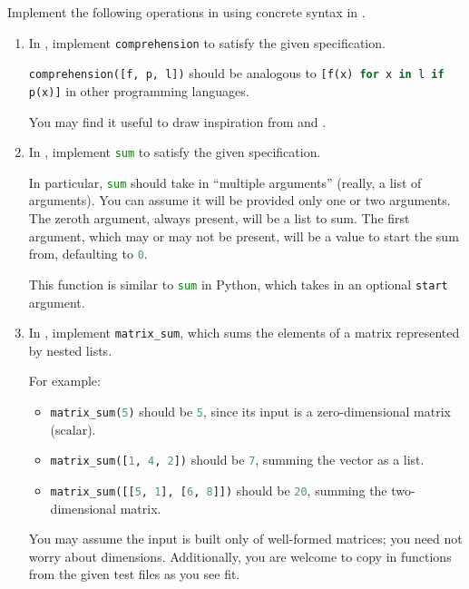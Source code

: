 \documentclass[11pt]{article}
\begin{document}
 Implement the following operations in \LangPyCF{} using concrete syntax in .
\begin{enumerate}
  \item
    In , implement \lstinline[language=Python]|comprehension| to satisfy the given specification.

    \lstinline[language=Python]|comprehension([f, p, l])| should be analogous to \lstinline[language=Python]|[f(x) for x in l if p(x)]| in other programming languages.

    \begin{hint}
      You may find it useful to draw inspiration from  and .
    \end{hint}

  \item
    In , implement \lstinline[language=Python]|sum| to satisfy the given specification.

    In particular, \lstinline[language=Python]|sum| should take in ``multiple arguments'' (really, a list of arguments).
    You can assume it will be provided only one or two arguments.
    The zeroth argument, always present, will be a list to sum.
    The first argument, which may or may not be present, will be a value to start the sum from, defaulting to \lstinline[language=Python]|0|.

    This function is similar to \lstinline[language=Python]|sum| in Python, which takes in an optional \lstinline[language=Python]|start| argument.

  \item
    In , implement \lstinline[language=Python]|matrix_sum|, which sums the elements of a matrix represented by nested lists.

    For example:
    \begin{itemize}
      \item \lstinline[language=Python]|matrix_sum(5)| should be \lstinline[language=Python]|5|, since its input is a zero-dimensional matrix (scalar).
      \item \lstinline[language=Python]|matrix_sum([1, 4, 2])| should be \lstinline[language=Python]|7|, summing the vector as a list.
      \item \lstinline[language=Python]|matrix_sum([[5, 1], [6, 8]])| should be \lstinline[language=Python]|20|, summing the two-dimensional matrix.
    \end{itemize}
    You may assume the input is built only of well-formed matrices; you need not worry about dimensions.
    Additionally, you are welcome to copy in functions from the given test files as you see fit.
\end{enumerate}
\end{document}
